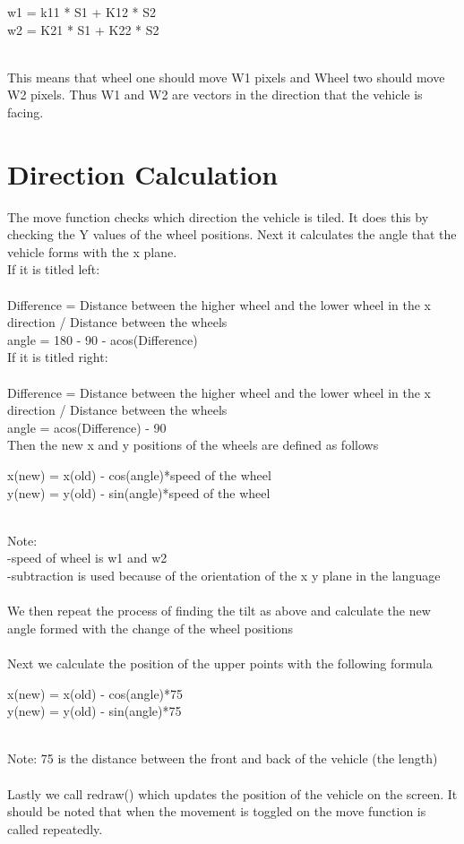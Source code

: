 \documentclass{article}
\begin{document}
\begin{center}
w1 = k11 * S1 + K12 * S2 \\
w2 = K21 * S1 + K22 *  S2
\end{center}
\\
This means that wheel one should move W1 pixels and Wheel two should move W2 pixels. Thus W1 and W2 are vectors in the direction that the vehicle is facing.

\section*{Direction Calculation}

The move function checks which direction the vehicle is tiled. It does this by checking the Y values of the wheel positions. Next it calculates the angle that the vehicle forms with the x plane. \\
If it is titled left:\\
\\
Difference = Distance between the higher wheel and the lower wheel in the x direction / Distance between the wheels \\
angle = 180 - 90 - acos(Difference)\\

If it is titled right:\\
\\
Difference = Distance between the higher wheel and the lower wheel in the x direction / Distance between the wheels\\
angle = acos(Difference) - 90\\


Then the new x and y positions of the wheels are defined as follows
\begin{center}
x(new) = x(old) - cos(angle)*speed of the wheel\\
y(new) = y(old) - sin(angle)*speed of the wheel\\
\end{center}
\\
Note: \\
-speed of wheel is w1 and w2\\
-subtraction is used because of the orientation of the x y plane in the language\\
 \\   
We then repeat the process of finding the tilt as above and calculate the new angle formed with the change of the wheel positions\\
\\
Next we calculate the position of the upper points with the following formula

\begin{center}
x(new) = x(old) - cos(angle)*75\\
y(new) = y(old) - sin(angle)*75\\
\end{center}
\\
Note: 75 is the distance between the front and back of the vehicle (the length)\\
\\
Lastly we call redraw() which updates the position of the vehicle on the screen. It should be noted that when the movement is toggled on the move function is called repeatedly. 
\end{document}
